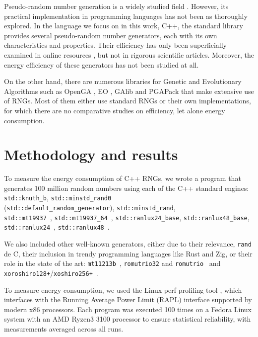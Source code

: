 \documentclass[dvipsnames,format=sigconf,anonymous=true,review=true]{acmart}
\begin{document}
Pseudo-random number generation is a widely studied field \cite{marsaglia2003random}. However, its practical implementation in programming languages has not been as thoroughly explored. In the language we focus on in this work, C++, the standard library provides several pseudo-random number generators, each with its own characteristics and properties. Their efficiency has only been superficially examined in online resources \cite{kd9f9-2020,arbelaez-2016}, but not in rigorous scientific articles. Moreover, the energy efficiency of these generators has not been studied at all.

On the other hand, there are numerous libraries for Genetic and Evolutionary Algorithms such as OpenGA \cite{8122921}, EO \cite{keijzer2001evolving}, GAlib \cite{wall1996galib} and PGAPack \cite{levine1996users} that make extensive use of RNGs. Most of them either use standard RNGs or their own implementations, for which there are no comparative studies on efficiency, let alone energy consumption.

\section{Methodology and results}
\label{sec:methodology}

To measure the energy consumption of C++ RNGs, we wrote a program that generates 100 million random numbers using each of the C++ standard engines: \texttt{std::knuth\_b},  \texttt{std::minstd\_rand0} \\(\texttt{std::default\_random\_generator}),  \texttt{std::minstd\_rand}, \\ \texttt{std::mt19937}~\cite{mersennetwister},  \texttt{std::mt19937\_64}~\cite{mersennetwister}, \texttt{std::ranlux24\_base}, \texttt{std::ranlux48\_base},  \texttt{std::ranlux24}~\cite{JAMES1994111}, \texttt{std::ranlux48}~\cite{JAMES1994111}.

We also included other well-known generators, either due to their relevance, \texttt{rand} de C, their inclusion in trendy programming languages like Rust and Zig, or their role in the state of the art: \texttt{mt11213b}~\cite{mersennetwister}, \texttt{romutrio32} and \texttt{romutrio}~\cite{overton2020romufastnonlinearpseudorandom} and \texttt{xoroshiro128+}/\-\texttt{xoshiro256+}~\cite{blackman2021scrambled}.

To measure energy consumption, we used the Linux perf profiling tool \cite{perf}, which interfaces with the Running Average Power Limit (RAPL) interface \cite{rapl} supported by modern x86 processors. Each program was executed 100 times on a Fedora Linux system with an AMD Ryzen3 3100 processor to ensure statistical reliability, with measurements averaged across all runs.
\end{document}
